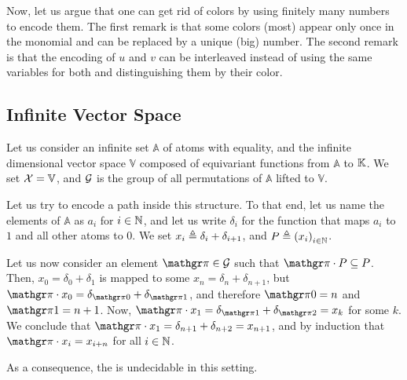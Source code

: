 Now, let us argue that one can get rid of colors by using 
finitely many numbers to encode them. 
The first remark is that some colors (most) appear only once 
in the monomial and can be replaced by a unique (big) number.
The second remark is that the encoding of $u$ and $v$ can be interleaved
instead of using the same variables for both and distinguishing them
by their color. 




\subsection{Infinite Vector Space}
\label{subsec:vector}

Let us consider an infinite set $\mathbb{A}$ of atoms with equality, and the
infinite dimensional vector space $\mathbb{V}$ composed of equivariant
functions from $\mathbb{A}$ to $\mathbb{K}$. We set $\mathcal{X} = \mathbb{V}$, and
$\mathcal{G}$ is the group of all permutations of $\mathbb{A}$
lifted to $\mathbb{V}$.

Let us try to encode a path inside this structure. To that end, let us name the
elements of $\mathbb{A}$ as $a_i$ for $i \in \mathbb{N}$, and let us write $\delta_i$
for the function that maps $a_i$ to $1$ and all other atoms to $0$. We set $x_i
\triangleq \delta_i + \delta_{i+1}$, and $P \defined \seqof{x_i}[i \in \N]$.

Let us now consider an element $\gelem \in \group$ such that $\gelem \cdot P
\subseteq P$. Then, $x_0 = \delta_0 + \delta_1$ is mapped to some $x_n =
\delta_n + \delta_{n+1}$, but $\gelem \cdot x_0 = \delta_{\gelem 0} +
\delta_{\gelem 1}$, and therefore $\gelem 0 = n$ and $\gelem 1 = n + 1$. Now,
$\gelem \cdot x_1 = \delta_{\gelem 1} + \delta_{\gelem 2} = x_k$ for some $k$.
We conclude that $\gelem \cdot x_1 = \delta_{n + 1} + \delta_{n + 2} = x_{n +
1}$, and by induction that $\gelem \cdot x_i = x_{i + n}$ for all $i \in \mathbb{N}$.

As a consequence, the  is undecidable
in this setting.


